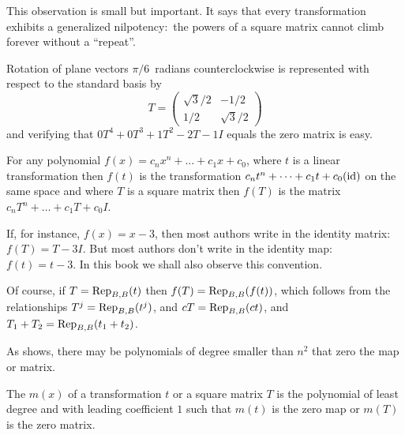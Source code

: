 \begin{remark}
This observation is small but important.
It says that every transformation exhibits a 
generalized nilpotency:~the powers
of a square matrix cannot climb forever without a ``repeat''.
\end{remark}

\begin{example}  \label{ex:PolySendRotMatToZ}
Rotation of plane vectors \( \pi/6 \)~radians counterclockwise is represented
with respect to the standard basis by
\begin{equation*}
  T=
  \begin{pmatrix}
     \sqrt{3}/2  &-1/2  \\
     1/2         &\sqrt{3}/2
  \end{pmatrix}
\end{equation*}
and verifying that \( 0T^4+0T^3+1T^2-2T-1I \) equals the zero matrix is easy.
\end{example}

\begin{definition}
For any polynomial \( f(x)=c_nx^n+\dots+c_1x+c_0 \),
where \( t \) is a linear transformation then \( f(t) \) is the
transformation \( c_nt^n+\dots+c_1t+c_0(\identity) \) on the same space and
where \( T \) is a square matrix then \( f(T) \) is
the matrix \( c_nT^n+\dots+c_1T+c_0I \).
\end{definition}

\begin{remark}
If, for instance, \( f(x)=x-3 \), then most authors
write in the identity matrix:~\( f(T)=T-3I \).
But most authors don't write in the identity map:~\( f(t)=t-3 \).
In this book we shall also observe this convention.
\end{remark}

Of course, if \( T=\rep{t}{B,B} \) then \( f(T)=\rep{f(t)}{B,B} \),
which follows from the relationships \( T^j=\rep{t^j}{B,B} \),
and \( cT=\rep{ct}{B,B} \), and \( T_1+T_2 =\rep{t_1+t_2}{B,B} \).

As  shows, there may be polynomials of
degree smaller than $n^2$ that zero the map or matrix.

\begin{definition}
The %
\( m(x) \) of a transformation \( t \)
or a square matrix \( T \) is the
polynomial of least degree and with leading coefficient \( 1 \)
such that \( m(t) \) is the zero map or \( m(T) \) is the zero matrix.
\end{definition}

